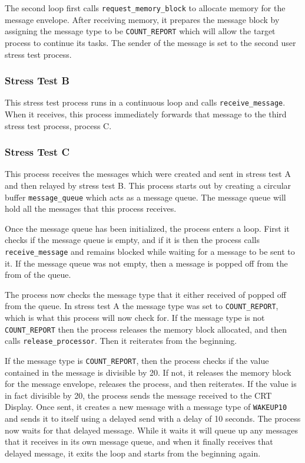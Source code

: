 \documentclass[se]{uw-wkrpt}
\begin{document}
The second loop first calls \texttt{request\_memory\_block} to allocate memory for the message envelope. After receiving memory, it prepares the message block by assigning the message type to be \texttt{COUNT\_REPORT} which will allow the target process to continue its tasks. The sender of the message is set to the second user stress test process.


\subsubsection{Stress Test B}

This stress test process runs in a continuous loop and calls \texttt{receive\_message}. When it receives, this process immediately forwards that message to the third stress test process, process C.


\subsubsection{Stress Test C}

This process receives the messages which were created and sent in stress test A and then relayed by stress test B. This process starts out by creating a circular buffer \texttt{message\_queue} which acts as a message queue. The message queue will hold all the messages that this process receives.

Once the message queue has been initialized, the process enters a loop. First it checks if the message queue is empty, and if it is then the process calls \texttt{receive\_message} and remains blocked while waiting for a message to be sent to it. If the message queue was not empty, then a message is popped off from the from of the queue.

The process now checks the message type that it either received of popped off from the queue. In stress test A the message type was set to \texttt{COUNT\_REPORT}, which is what this process will now check for. If the message type is not \texttt{COUNT\_REPORT} then the process releases the memory block allocated, and then calls \texttt{release\_processor}. Then it reiterates from the beginning.

If the message type is \texttt{COUNT\_REPORT}, then the process checks if the value contained in the message is divisible by 20. If not, it releases the memory block for the message envelope, releases the process, and then reiterates. If the value is in fact divisible by 20, the process sends the message received to the CRT Display. Once sent, it creates a new message with a message type of \texttt{WAKEUP10} and sends it to itself using a delayed send with a delay of 10 seconds. The process now waits for that delayed message. While it waits it will queue up any messages that it receives in its own message queue, and when it finally receives that delayed message, it exits the loop and starts from the beginning again. 
\end{document}
